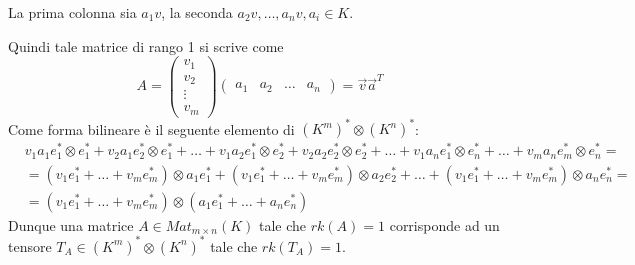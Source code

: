 \documentclass[../main.tex]{subfiles}
\begin{document}
La prima colonna sia $a_1v$, la seconda $a_2v, \ldots , a_nv, a_i \in K$.

Quindi tale matrice di rango 1 si scrive come
\begin{equation*}
    A = \begin{pmatrix}
        v_1    \\
        v_2    \\
        \vdots \\
        v_m
    \end{pmatrix}
    \begin{pmatrix}
        a_1 & a_2 & \ldots & a_n
    \end{pmatrix} = \overrightarrow{v} \overrightarrow{a}^T
\end{equation*}
Come forma bilineare è il seguente elemento di $(K^m)^* \otimes (K^n)^*$:
\begin{align*}
     & v_1 a_1 e_1^* \otimes e_1^* + v_2 a_1 e_2^* \otimes e_1^* + \ldots + v_1 a_2 e_1^* \otimes e_2^* + v_2 a_2 e_2^* \otimes e_2^* + \ldots + v_1 a_n e_1^* \otimes e_n^* + \ldots + v_m a_n e_m^* \otimes e_n^* = \\
     & = (v_1 e_1^* + \ldots + v_m e_m^*) \otimes a_1 e_1^* + (v_1 e_1^* + \ldots +v_m e_m^*) \otimes a_2 e_2^* + \ldots +(v_1 e_1^* + \ldots + v_m e_m^*) \otimes a_n e_n^* =                                        \\
     & = (v_1 e_1^* + \ldots + v_m e_m^*) \otimes (a_1 e_1^* + \ldots + a_n e_n^*)
\end{align*}
Dunque una matrice $A \in Mat_{m \times n} (K)$ tale che $rk(A) = 1$ corrisponde ad un tensore $T_A \in (K^m)^* \otimes (K^n)^*$ tale che $rk(T_A) = 1$.
\end{document}
